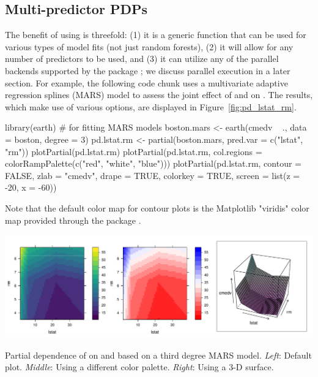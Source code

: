 \subsection{Multi-predictor PDPs}

The benefit of using  is threefold: (1) it is a generic function that can be used for various types of model fits (not just random forests), (2) it will allow for any number of predictors to be used, and (3) it can utilize any of the parallel backends supported by the  package \citep{foreach-pkg}; we discuss parallel execution in a later section. For example, the following code chunk uses a multivariate adaptive regression splines (MARS) model \citep{friedman-1991-mars} to assess the joint effect of  and  on . The results, which make use of various  options, are displayed in Figure~\ref{fig:pd_lstat_rm}.
\begin{example}
library(earth)  # for fitting MARS models
boston.mars <- earth(cmedv ~ ., data = boston, degree = 3)
pd.lstat.rm <- partial(boston.mars, pred.var = c("lstat", "rm"))
plotPartial(pd.lstat.rm)
plotPartial(pd.lstat.rm, col.regions = colorRampPalette(c("red", "white", "blue")))
plotPartial(pd.lstat.rm, contour = FALSE, zlab = "cmedv", drape = TRUE,
            colorkey = TRUE, screen = list(z = -20, x = -60))
\end{example}
Note that the default color map for contour plots is the Matplotlib "viridis" color map provided through the  package \citep{viridis-pkg}.

\begin{widefigure}[htbp]
  \centering
  \includegraphics[width=1.0\linewidth]{pd_lstat_rm}
  \caption{Partial dependence of  on  and  based on a third degree MARS model. \textit{Left}: Default plot. \textit{Middle}: Using a different color palette. \textit{Right}: Using a 3-D surface.}
  \label{fig:pd_lstat_rm}
\end{widefigure}


